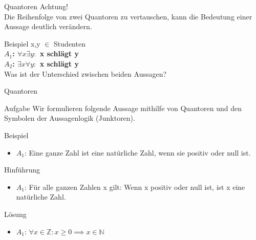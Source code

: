 \begin{frame}[fragile]{Quantoren}
    \alert{Achtung!}\\
    Die Reihenfolge von zwei Quantoren zu vertauschen, kann die Bedeutung einer Aussage deutlich verändern.
    \begin{exampleblock}{Beispiel}
        x,y $\in$ Studenten\\
        \textbf{$A_1$: $\forall x \exists y:$ x schlägt y\\
        $A_2$: $\exists x \forall y:$ x schlägt y\\ }
        Was ist der Unterschied zwischen beiden Aussagen?
    \end{exampleblock}
\end{frame}

\begin{frame}{Quantoren}
    \begin{alertblock}{Aufgabe}
      Wir formulieren folgende Aussage mithilfe von Quantoren und den Symbolen der Aussagenlogik (Junktoren).
    \end{alertblock}
    \begin{block}{Beispiel}
    \begin{itemize}
        \item $A_1$: Eine ganze Zahl ist eine natürliche Zahl, wenn sie positiv oder null ist.
    \end{itemize}
    \end{block}
    \begin{block}{Hinführung}
    \begin{itemize}
        \item $A_1$: Für alle ganzen Zahlen x gilt: Wenn x positiv oder null ist, ist x eine natürliche Zahl.
    \end{itemize}
    \end{block}
    \begin{block}{\alert{Lösung}}
    \begin{itemize}
        \item $A_1$: $\forall x \in \mathbb{Z}: x \geq 0 \implies x \in \mathbb{N}$
    \end{itemize}
    \end{block}
\end{frame}

